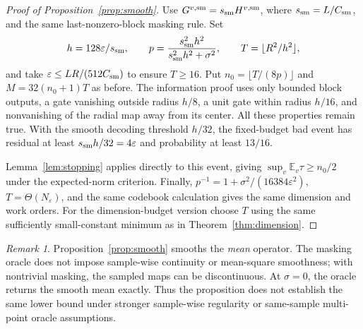 \documentclass[11pt,a4paper]{article}
\newcommand{\E}{\mathbb E}
\newcommand{\eps}{\varepsilon}
\theoremstyle{definition}
\theoremstyle{remark}
\newtheorem{remark}[theorem]{Remark}
\begin{document}
\begin{proof}[Proof of Proposition~\ref{prop:smooth}]
Use $G^{v,{\rm sm}}=s_{\rm sm}H^{v,{\rm sm}}$, where $s_{\rm sm}=L/C_{\rm sm}$, and the same last-nonzero-block masking rule. Set
\[
 h=128\eps/s_{\rm sm},\qquad
 p=\frac{s_{\rm sm}^2h^2}{s_{\rm sm}^2h^2+\sigma^2},\qquad
 T=\lfloor R^2/h^2\rfloor,
\]
and take $\eps\le LR/(512C_{\rm sm})$ to ensure $T\ge16$. Put $n_0=\lfloor T/(8p)\rfloor$ and $M=32(n_0+1)T$ as before. The information proof uses only bounded block outputs, a gate vanishing outside radius $h/8$, a unit gate within radius $h/16$, and nonvanishing of the radial map away from its center. All these properties remain true. With the smooth decoding threshold $h/32$, the fixed-budget bad event has residual at least $s_{\rm sm}h/32=4\eps$ and probability at least $13/16$.

Lemma~\ref{lem:stopping} applies directly to this event, giving
$\sup_v\E_v\tau\ge n_0/2$ under the expected-norm criterion.
Finally, $p^{-1}=1+\sigma^2/(16384\eps^2)$, $T=\Theta(N_\eps)$, and the same codebook calculation gives the same dimension and work orders. For the dimension-budget version choose $T$ using the same sufficiently small-constant minimum as in Theorem~\ref{thm:dimension}.
\end{proof}

\begin{remark}
Proposition~\ref{prop:smooth} smooths the \emph{mean} operator.  The masking oracle does not impose sample-wise continuity or mean-square smoothness; with nontrivial masking, the sampled maps can be discontinuous. At $\sigma=0$, the oracle returns the smooth mean exactly.  Thus the proposition does not establish the same lower bound under stronger sample-wise regularity or same-sample multi-point oracle assumptions.
\end{remark}
\end{document}
